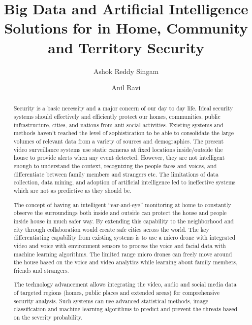 \documentclass[sigconf]{acmart}
\begin{document}
\title{Big Data and Artificial Intelligence Solutions for in Home, Community and Territory Security}


\author{Ashok Reddy Singam}

\author{Anil Ravi}

\begin{abstract}
Security is a basic necessity and a major concern of our day to day life.  Ideal security systems should effectively and efficiently protect our homes, communities, public infrastructure,
cities, and nations from anti social activities. Existing systems and methods haven't reached the level of sophistication to be able to consolidate the large volumes of relevant data from a variety of sources and demographics. The present video surveillance systems use static cameras at fixed locations inside/outside the house to provide alerts when any event detected. However, they are not intelligent enough to understand the context, recognizing the people faces and voices, and differentiate between family members and strangers etc. The limitations of data collection, data mining, and adoption of artificial intelligence led to ineffective systems which are not as predictive as they should be.

The concept of having an intelligent ``ear-and-eye'' monitoring at home to constantly observe the surroundings both inside and outside can protect the house and people inside house in much safer way. By extending this capability to the neighborhood and city through collaboration would create safe cities across the world. 
The key differentiating capability from existing systems is to use a micro drone with integrated video and voice with environment sensors to process the voice and facial data with machine learning algorithms. The limited range micro drones can freely move around the house based on the voice and video analytics while learning about family members, friends and strangers. 

The technology advancement allows integrating the video, audio and social media data of targeted regions (homes, public places and extended areas) for comprehensive security analysis. Such systems can use advanced statistical methods, image classification and machine learning algorithms to predict and prevent the threats based on the severity probability.

\end{abstract}
\end{document}
